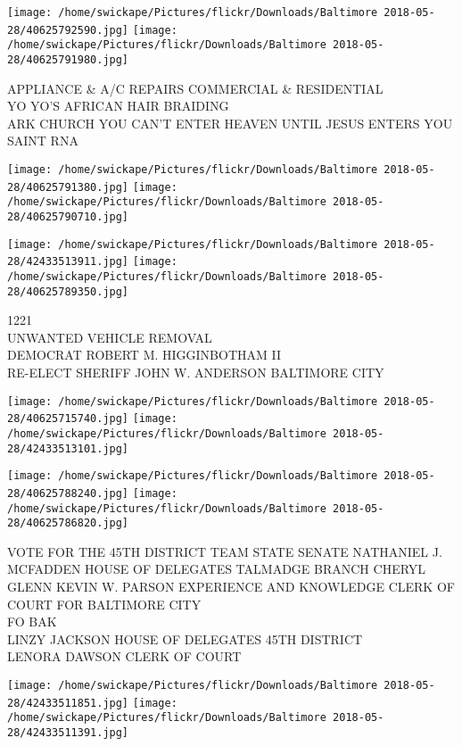 \documentclass[10pt,letterpaper]{article}
\begin{document}
\texttt{[image: /home/swickape/Pictures/flickr/Downloads/Baltimore 2018-05-28/40625792590.jpg]}
\texttt{[image: /home/swickape/Pictures/flickr/Downloads/Baltimore 2018-05-28/40625791980.jpg]}

APPLIANCE \& A/C REPAIRS COMMERCIAL \& RESIDENTIAL\\
YO YO'S AFRICAN HAIR BRAIDING\\
ARK CHURCH YOU CAN'T ENTER HEAVEN UNTIL JESUS ENTERS YOU\\
SAINT RNA\\
\pagebreak

\texttt{[image: /home/swickape/Pictures/flickr/Downloads/Baltimore 2018-05-28/40625791380.jpg]}
\texttt{[image: /home/swickape/Pictures/flickr/Downloads/Baltimore 2018-05-28/40625790710.jpg]}

\texttt{[image: /home/swickape/Pictures/flickr/Downloads/Baltimore 2018-05-28/42433513911.jpg]}
\texttt{[image: /home/swickape/Pictures/flickr/Downloads/Baltimore 2018-05-28/40625789350.jpg]}

1221\\
UNWANTED VEHICLE REMOVAL\\
DEMOCRAT ROBERT M. HIGGINBOTHAM II\\
RE{-}ELECT SHERIFF JOHN W. ANDERSON BALTIMORE CITY\\
\pagebreak

\texttt{[image: /home/swickape/Pictures/flickr/Downloads/Baltimore 2018-05-28/40625715740.jpg]}
\texttt{[image: /home/swickape/Pictures/flickr/Downloads/Baltimore 2018-05-28/42433513101.jpg]}

\texttt{[image: /home/swickape/Pictures/flickr/Downloads/Baltimore 2018-05-28/40625788240.jpg]}
\texttt{[image: /home/swickape/Pictures/flickr/Downloads/Baltimore 2018-05-28/40625786820.jpg]}

VOTE FOR THE 45TH DISTRICT TEAM STATE SENATE NATHANIEL J. MCFADDEN HOUSE OF DELEGATES TALMADGE BRANCH CHERYL GLENN KEVIN W. PARSON EXPERIENCE AND KNOWLEDGE CLERK OF COURT FOR BALTIMORE CITY\\
FO BAK\\
LINZY JACKSON HOUSE OF DELEGATES 45TH DISTRICT\\
LENORA DAWSON CLERK OF COURT\\
\pagebreak

\texttt{[image: /home/swickape/Pictures/flickr/Downloads/Baltimore 2018-05-28/42433511851.jpg]}
\texttt{[image: /home/swickape/Pictures/flickr/Downloads/Baltimore 2018-05-28/42433511391.jpg]}
\end{document}
